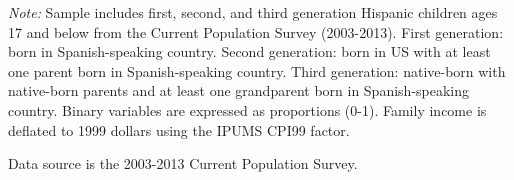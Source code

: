 \begin{table}[H]
{\begin{threeparttable}
\begin{tabular}[t]{lrrrrrrrr}
\bottomrule
\end{tabular}
\begin{tablenotes}
\item \textit{Note: } Sample includes first, second, and third generation Hispanic children ages 17 and below from the Current Population Survey (2003-2013). First generation: born in Spanish-speaking country. Second generation: born in US with at least one parent born in Spanish-speaking country. Third generation: native-born with native-born parents and at least one grandparent born in Spanish-speaking country. Binary variables are expressed as proportions (0-1). Family income is deflated to 1999 dollars using the IPUMS CPI99 factor.
\item Data source is the 2003-2013 Current Population Survey.
\end{tablenotes}
\end{threeparttable}}
\end{table}
